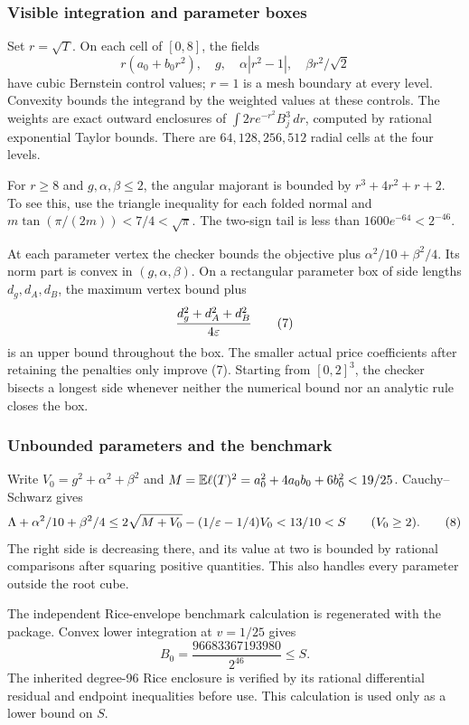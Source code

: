 \subsubsection{Visible integration and parameter boxes}
Set $r=\sqrt T$. On each cell of $[0,8]$, the fields
\[
 r(a_0+b_0r^2),\quad g,\quad\alpha|r^2-1|,\quad\beta r^2/\sqrt2
\]
have cubic Bernstein control values; $r=1$ is a mesh boundary at every
level. Convexity bounds the integrand by the weighted values at these
controls. The weights are exact outward enclosures of
$\int 2re^{-r^2}B_j^3\,dr$, computed by rational exponential Taylor
bounds. There are $64,128,256,512$ radial cells at the four levels.

For $r\ge8$ and $g,\alpha,\beta\le2$, the angular majorant is bounded
by $r^3+4r^2+r+2$. To see this, use the triangle inequality for each
folded normal and $m\tan(\pi/(2m))<7/4<\sqrt\pi$.
The two-sign tail is less than $1600e^{-64}<2^{-46}$.

At each parameter vertex the checker bounds the objective plus
$\alpha^2/10+\beta^2/4$. Its norm part is convex in $(g,\alpha,\beta)$.
On a rectangular parameter box of side lengths $d_g,d_A,d_B$, the
maximum vertex bound plus
\[
 \frac{d_g^2+d_A^2+d_B^2}{4\varepsilon}                           \tag{7}
\]
is an upper bound throughout the box. The smaller actual price
coefficients after retaining the penalties only improve (7).
Starting from $[0,2]^3$, the checker bisects a longest side whenever
neither the numerical bound nor an analytic rule closes the box.

\subsubsection{Unbounded parameters and the benchmark}
Write $V_0=g^2+\alpha^2+\beta^2$ and
$M=\mathbb E\ell(T)^2=a_0^2+4a_0b_0+6b_0^2<19/25$.
Cauchy--Schwarz gives
\[
 \Lambda+\alpha^2/10+\beta^2/4
 \le2\sqrt{M+V_0}-(1/\varepsilon-1/4)V_0<13/10<S
 \qquad(V_0\ge2).                                       \tag{8}
\]
The right side is decreasing there, and its value at two is bounded
by rational comparisons after squaring positive quantities.
This also handles every parameter outside the root cube.

The independent Rice-envelope benchmark calculation is regenerated
with the package. Convex lower integration at $v=1/25$ gives
\[
 B_0=\frac{96683367193980}{2^{46}}\le S.                    \tag{9}
\]
The inherited degree-96 Rice enclosure is verified by its rational
differential residual and endpoint inequalities before use. This
calculation is used only as a lower bound on $S$.

